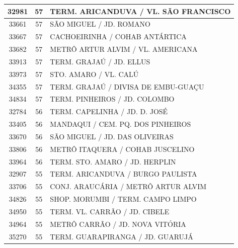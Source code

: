 \documentclass[
	12pt,				%
	oneside,			%
	a4paper,			%
	english,			%
	brazil				%
	]{abntex2ppgsi}
\begin{document}
\begin{apendicesenv}
\begin{longtable}{c|c|p{7cm}}
    32981 & 57    & TERM. ARICANDUVA / VL. SÃO FRANCISCO \\
\hline

    33661 & 57    & SÃO MIGUEL / JD. ROMANO \\
\hline

    33667 & 57    & CACHOEIRINHA / COHAB ANTÁRTICA \\
\hline

    33682 & 57    & METRÔ ARTUR ALVIM / VL. AMERICANA \\
\hline

    33913 & 57    & TERM. GRAJAÚ / JD. ELLUS \\
\hline

    33973 & 57    & STO. AMARO / VL. CALÚ \\
\hline

    34355 & 57    & TERM. GRAJAÚ / DIVISA DE EMBU-GUAÇU \\
\hline

    34834 & 57    & TERM. PINHEIROS / JD. COLOMBO \\
\hline

    32784 & 56    & TERM. CAPELINHA / JD. D. JOSÉ \\
\hline

    33405 & 56    & MANDAQUI / CEM. PQ. DOS PINHEIROS \\
\hline

    33670 & 56    & SÃO MIGUEL / JD. DAS OLIVEIRAS \\
\hline

    33806 & 56    & METRÔ ITAQUERA / COHAB JUSCELINO \\
\hline

    33964 & 56    & TERM. STO. AMARO / JD. HERPLIN \\
\hline

    32907 & 55    & TERM. ARICANDUVA / BURGO PAULISTA \\
\hline

    33706 & 55    & CONJ. ARAUCÁRIA / METRÔ ARTUR ALVIM \\
\hline

    34826 & 55    & SHOP. MORUMBI / TERM. CAMPO LIMPO \\
\hline

    34950 & 55    & TERM. VL. CARRÃO / JD. CIBELE \\
\hline

    34964 & 55    & METRÔ CARRÃO / JD. NOVA VITÓRIA \\
\hline

    35270 & 55    & TERM. GUARAPIRANGA / JD. GUARUJÁ \\
\hline


\end{longtable}
\end{apendicesenv}
\end{document}
